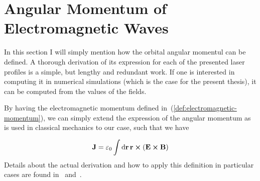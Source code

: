 \documentclass[12pt, class=report, crop=false]{standalone}
\begin{document}
\section{Angular Momentum of Electromagnetic Waves}

In this section I will simply mention how the orbital angular momentul can be defined. A thorough derivation of its expression for each of the presented laser profiles is a simple, but lengthy and redundant work. If one is interested in computing it in numerical simulations (which is the case for the present thesis), it can be computed from the values of the fields.

By having the electromagnetic momentum defined in~(\ref{def:electromagnetic-momentum}), we can simply extend the expression of the angular momentum as is used in classical mechanics to our case, such that we have

\begin{equation}
  \vb{J} = \varepsilon_0 \int \dd{\vb{r}} \vb{r}\cp(\vb{E}\cp\vb{B})
\end{equation}
Details about the actual derivation and how to apply this definition in particular cases are found in~\cite{belinfanteCurrentDensityElectric1940} and~\cite{humbletMomentImpulsionOnde1943}.
\end{document}
